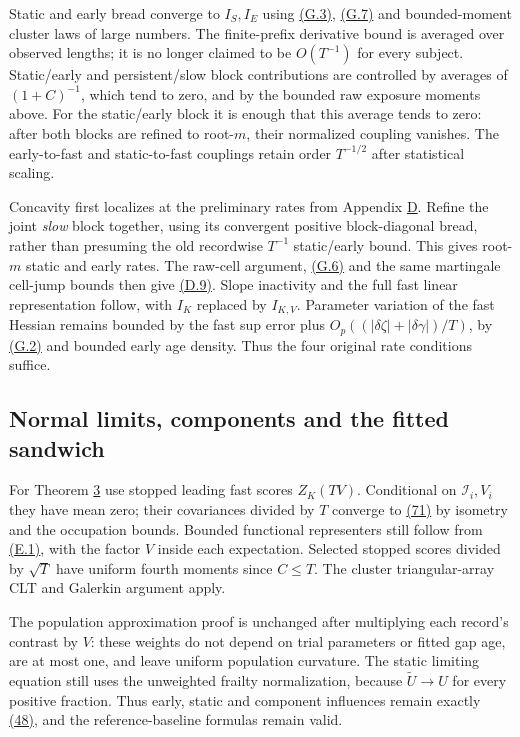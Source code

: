 \documentclass[11pt]{article}
\begin{document}
Static and early bread converge to \(I_S,I_E\) using \hyperref[eq:G.3]{(G.3)}, \hyperref[eq:G.7]{(G.7)} and bounded-moment cluster laws of large numbers. The finite-prefix derivative bound is averaged over observed lengths; it is no longer claimed to be \(O(T^{-1})\) for every subject. Static/early and persistent/slow block contributions are controlled by averages of \((1+C)^{-1}\), which tend to zero, and by the bounded raw exposure moments above. For the static/early block it is enough that this average tends to zero: after both blocks are refined to root-\(m\), their normalized coupling vanishes. The early-to-fast and static-to-fast couplings retain order \(T^{-1/2}\) after statistical scaling.

Concavity first localizes at the preliminary rates from Appendix \hyperref[sec:D]{D}. Refine the joint \emph{slow} block together, using its convergent positive block-diagonal bread, rather than presuming the old recordwise \(T^{-1}\) static/early bound. This gives root-\(m\) static and early rates. The raw-cell argument, \hyperref[eq:G.6]{(G.6)} and the same martingale cell-jump bounds then give \hyperref[eq:D.9]{(D.9)}. Slope inactivity and the full fast linear representation follow, with \(I_K\) replaced by \(I_{K,V}\). Parameter variation of the fast Hessian remains bounded by the fast sup error plus \(O_p((|\delta\zeta|+|\delta\gamma|)/T)\), by \hyperref[eq:G.2]{(G.2)} and bounded early age density. Thus the four original rate conditions suffice.

\subsection{Normal limits, components and the fitted sandwich}\label{sec:G.5}

For Theorem \hyperref[res:Theorem-3]{3} use stopped leading fast scores \(Z_K(TV)\). Conditional on \(\mathcal I_i,V_i\) they have mean zero; their covariances divided by \(T\) converge to \hyperref[eq:71]{(71)} by isometry and the occupation bounds. Bounded functional representers still follow from \hyperref[eq:E.1]{(E.1)}, with the factor \(V\) inside each expectation. Selected stopped scores divided by \(\sqrt T\) have uniform fourth moments since \(C\leq T\). The cluster triangular-array CLT and Galerkin argument apply.

The population approximation proof is unchanged after multiplying each record's contrast by \(V\): these weights do not depend on trial parameters or fitted gap age, are at most one, and leave uniform population curvature. The static limiting equation still uses the unweighted frailty normalization, because \(\widetilde U\to U\) for every positive fraction. Thus early, static and component influences remain exactly \hyperref[eq:48]{(48)}, and the reference-baseline formulas remain valid.
\end{document}
